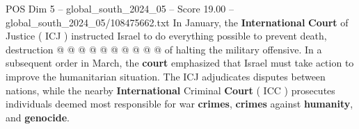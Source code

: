 \begin{textsample}{POS Dim 5 – global\_south\_2024\_05 – Score 19.00 – global\_south\_2024\_05/108475662.txt}
In January, the \textbf{International} \textbf{Court} of Justice ( ICJ ) instructed Israel to do everything possible to prevent death, destruction @ @ @ @ @ @ @ @ @ @ of halting the military offensive.
In a subsequent order in March, the \textbf{court} emphasized that Israel must take action to improve the humanitarian situation.
The ICJ adjudicates disputes between nations, while the nearby \textbf{International} Criminal \textbf{Court} ( ICC ) prosecutes individuals deemed most responsible for war \textbf{crimes}, \textbf{crimes} against \textbf{humanity}, and \textbf{genocide}.

\end{textsample}
